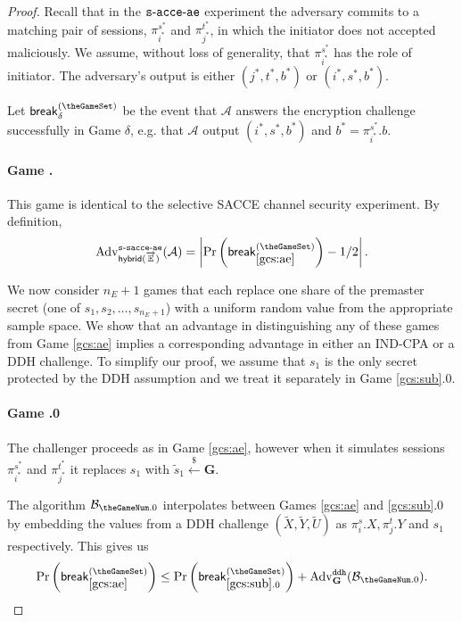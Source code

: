 \documentclass[USenglish,oneside,twocolumn]{article}
\theoremstyle{dgthm}
\theoremstyle{dgdef}
\newcounter{GameSet}
\newcounter{GameNum}[GameSet]
\newcommand{\Protocol}[1]{\operatorname{\mathsf{#1}}}
\newcommand{\abs}[1]{\left\vert#1\right\vert}
\newcommand{\samples}{\xleftarrow{\$}}
\newcommand{\p}[2]{\pi_{#1}^{#2}}
\newcommand{\Oracle}[1]{\mathcal #1}
\newcommand{\LGame}[1]{\refstepcounter{GameNum}\label{#1}\paragraph*{Game \theGameNum.~}}
\newcommand{\brk}[1]{\mathsf{break}_{#1}^{(\theGameSet)}}
\newcommand{\Prb}[1]{\mathrm{Pr}\left(\brk{#1}\right)}
\newcommand{\Experiment}[1]{\operatorname{\tt{#1}}}
\newcommand{\Algorithm}[1]{\mathcal #1}
\newcommand{\AdvName}[2]{\operatorname{\mathrm{Adv}_{\Protocol{#1}}^{\Experiment{#2}}}}
\newcommand{\Adv}[3]{\AdvName{#1}{#2}(\Algorithm{#3})}
\newcommand{\SAcceAeHybridK}[1]{\Adv{hybrid(\overrightarrow{\mathbb{E}})}{s-sacce-ae}{#1}}
\newcommand{\AdvDdh}[1]{\Adv{\mathbf{G}}{ddh}{#1}}
\begin{document}
\begin{proof}


  Recall that in the $\Experiment{s-acce-ae}$ experiment the adversary commits to a
  matching pair of sessions, $\p{i^*}{s^*}$ and $\p{j^*}{t^*}$, in which the initiator
  does not accepted maliciously.
  We assume, without loss of generality, that $\p{i^*}{s^*}$ has the role of initiator.
  The adversary's output is either $(j^*, t^*, b^*)$ or $(i^*, s^*, b^*)$.

  Let $\brk{\delta}$ be the event that $\Oracle{A}$ answers the encryption challenge
  successfully in Game $\delta$, e.g. that $\Oracle{A}$ output $(i^*, s^*, b^*)$ and $b^* = \p{i^*}{s^*}.b$.

  \LGame{gcs:ae} This game is identical to the selective SACCE channel security
  experiment. By definition,
  \begin{equation}
  \SAcceAeHybridK{A} = \abs{\Prb{\ref{gcs:ae}} - 1/2}.
  \end{equation}

  We now consider $n_E+1$ games that each replace one share of the
  premaster secret (one of $s_1, s_2, \dots, s_{n_E+1}$) with a uniform random
  value from the appropriate sample space. We show that an advantage in distinguishing
  any of these games from Game \ref{gcs:ae} implies a corresponding advantage in either an
  IND-CPA or a DDH challenge. To simplify our proof, we assume that $s_1$ is the only secret
  protected by the DDH assumption and we treat it separately in Game \ref{gcs:sub}.0.

  \label{gcs:sub}
  \paragraph*{Game \theGameNum.0}
  The challenger proceeds as in Game \ref{gcs:ae}, however when it simulates sessions
  $\p{i^*}{s^*}$ and $\p{j^*}{t^*}$ it replaces $s_1$ with $\tilde s_1 \samples \mathbf{G}$.

  The algorithm $\Oracle{B}_{\theGameNum.0}$ interpolates between Games
  \ref{gcs:ae} and \ref{gcs:sub}$.0$ by embedding the values from a DDH
  challenge $(\tilde{X}, \tilde{Y}, \tilde{U})$ as $\p{i}{s}.X, \p{j}{t}.Y$ and
  $s_1$ respectively. This gives us
  \begin{equation} \label{eq:subadvddh}
    \Prb{\ref{gcs:ae}} \le \Prb{\ref{gcs:sub}.0} + \AdvDdh{B_{\theGameNum.0}}.
  \end{equation}


\end{proof}
\end{document}
